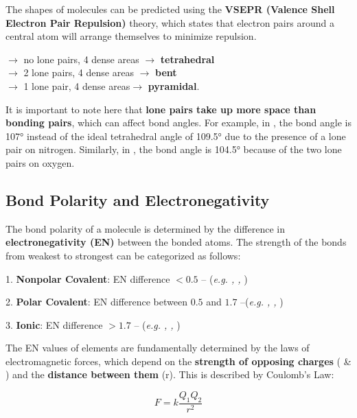 \documentclass[10pt]{article}
\begin{document}
  The shapes of molecules can be predicted using the \textbf{VSEPR (Valence Shell Electron Pair Repulsion)} theory, which states that electron pairs around a central atom will arrange themselves to minimize repulsion.
  
  
   $\rightarrow$ no lone pairs, 4  dense areas $\rightarrow$ \textbf{tetrahedral} \\
   $\rightarrow$ 2 lone pairs, 4  dense areas $\rightarrow$ \textbf{bent} \\
   $\rightarrow$ 1 lone pair, 4  dense areas$\rightarrow$ \textbf{pyramidal}.

  \begin{definition}
  It is important to note here that \textbf{lone pairs take up more space than bonding pairs}, which can affect bond angles. For example, in , the bond angle is 107° instead of the ideal tetrahedral angle of 109.5° due to the presence of a lone pair on nitrogen. Similarly, in , the bond angle is 104.5° because of the two lone pairs on oxygen.
  \end{definition}

  \subsection{Bond Polarity and Electronegativity}

  The bond polarity of a molecule is determined by the difference in \textbf{electronegativity (EN)} between the bonded atoms. The strength of the bonds from weakest to strongest can be categorized as follows:

  1. \textbf{Nonpolar Covalent}: EN difference $< 0.5$ -- (\textit{e.g. , , })

  2. \textbf{Polar Covalent}: EN difference between $0.5$ and $1.7$ --(\textit{e.g. , , })
  
  3. \textbf{Ionic}: EN difference $> 1.7$ -- (\textit{e.g. , , })

  The EN values of elements are fundamentally determined by the laws of electromagnetic forces, which depend on the \textbf{strength of opposing charges} ( \& ) and the \textbf{distance between them} (r). This is described by Coulomb's Law:
  
  \[
  F = k \frac{Q_1 Q_2}{r^2}
  \]
  
\end{document}
